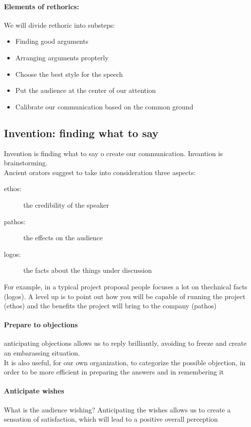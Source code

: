 \documentclass{article}
\begin{document}
\paragraph{Elements of  rethorics:} We will divide rethoric into substeps:
\begin{itemize}
\item Finding good arguments
\item Arranging arguments propterly
\item Choose the best style for the speech
\item Put the audience at the center of our attention
\item Calibrate our communication based on the common ground
\end{itemize}


\subsection{Invention: finding what to say}
Invention is finding what to say o create our communication. Invantion is brainstorming.\\
Ancient orators suggest to take into consideration three aspects:
\begin{description}
\item[ethos:] the credibility of the speaker
\item[pathos:] the effects on the audience
\item[logos:] the facts about the things under discussion
\end{description}
For example, in a typical project proposal people focuses a lot on thechnical facts (logos). A level up is to point out how you will be capable of running the project (ethos) and the benefits the project will bring to the company (pathos)
\paragraph{Prepare to objections} anticipating objections allows us to reply brilliantly, avoiding to freeze and create an embarassing situation.\\
It is also useful, for our own organization, to categorize the possible objection, in order to be more efficient in preparing the answers and in remembering it
\paragraph{Anticipate wishes} What is the audience wishing? Anticipating the wishes allows us to create a sensation of satisfaction, which will lead to a positive overall perception
\end{document}
